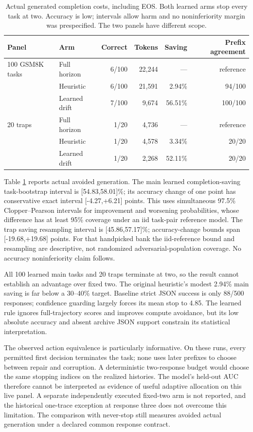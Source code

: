 \documentclass{article}
\begin{document}
\begin{table}[t]
\centering
\caption{Actual generated completion costs, including EOS. Both learned arms
stop every task at two. Accuracy is low; intervals allow harm and no
noninferiority margin was prespecified. The two panels have different scope.}
\label{tab:live}
\begin{tabular}{llrrrr}
\toprule
Panel & Arm & Correct & Tokens & Saving & Prefix agreement\\
\midrule
100 GSM8K tasks & Full horizon & 6/100 & 22,244 & --- & reference\\
 & Heuristic & 6/100 & 21,591 & 2.94\% & 94/100\\
 & Learned drift & 7/100 & 9,674 & 56.51\% & 100/100\\
20 traps & Full horizon & 1/20 & 4,736 & --- & reference\\
 & Heuristic & 1/20 & 4,578 & 3.34\% & 20/20\\
 & Learned drift & 1/20 & 2,268 & 52.11\% & 20/20\\
\bottomrule
\end{tabular}
\end{table}

Table \ref{tab:live} reports actual avoided generation. The main learned
completion-saving task-bootstrap interval is [54.83,58.01]\%; its accuracy
change of one point has conservative exact interval [-4.27,+6.21] points.
This uses simultaneous 97.5\% Clopper--Pearson intervals \citep{clopper1934} for improvement and
worsening probabilities, whose difference has at least 95\% coverage under an
iid task-pair reference model. The trap saving resampling interval is
[45.86,57.17]\%; accuracy-change bounds span [-19.68,+19.68] points.
For that handpicked bank the iid-reference bound and resampling are
descriptive, not randomized adversarial-population coverage. No accuracy
noninferiority claim follows.

All 100 learned main tasks and 20 traps terminate at two, so the result cannot
establish an advantage over fixed two. The original heuristic's modest 2.94\%
main saving is far below a 30--40\% target. Baseline strict JSON success is only
88/500 responses; confidence guarding largely forces its mean stop to 4.85.
The learned rule ignores full-trajectory scores and improves compute avoidance,
but its low absolute accuracy and absent archive JSON support constrain its
statistical interpretation.

The observed action equivalence is particularly informative. On these runs,
every permitted first decision terminates the task; none uses later prefixes
to choose between repair and corruption. A deterministic two-response budget
would choose the same stopping indices on the realized histories. The model's
held-out AUC therefore cannot be interpreted as evidence of useful adaptive
allocation on this live panel. A separate independently executed fixed-two
arm is not reported, and the historical one-trace exception at response three
does not overcome this limitation. The comparison with never-stop still
measures avoided actual generation under a declared common response contract.
\end{document}
